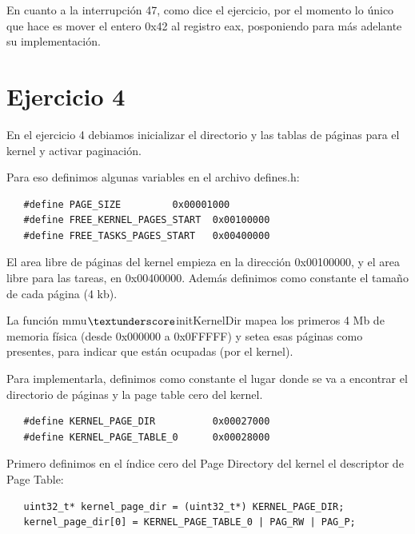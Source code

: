 \documentclass[a4paper]{article}
\newenvironment{codesnippet}{%
	\begin{Sbox}\begin{minipage}{\textwidth}\sffamily\small}%
	{\end{minipage}\end{Sbox}%
		\begin{center}%
		\vspace{-0.4cm}\colorbox{litegrey}{\TheSbox}\end{center}\vspace{0.3cm}}
\begin{document}
En cuanto a la interrupción 47, como dice el ejercicio, por el momento lo único que hace es mover el entero 0x42 al
registro eax, posponiendo para más adelante su implementación.


\section{Ejercicio 4}
En el ejercicio 4 debiamos inicializar el directorio y las tablas de páginas para el kernel y activar paginación.

Para eso definimos algunas variables en el archivo defines.h:

	\begin{codesnippet}
  \begin{verbatim}
   #define PAGE_SIZE  		 0x00001000
   #define FREE_KERNEL_PAGES_START  0x00100000 
   #define FREE_TASKS_PAGES_START   0x00400000
	  \end{verbatim}
\end{codesnippet}
	
El area libre de páginas del kernel empieza en la dirección 0x00100000, y el area libre para las tareas, en 0x00400000.
Además definimos como constante el tamaño de cada página (4 kb).

La función mmu$\textunderscore$initKernelDir mapea los primeros 4 Mb de memoria física (desde 0x000000 a 0x0FFFFF) y
setea esas páginas como presentes, para indicar que están ocupadas (por el kernel).

Para implementarla, definimos como constante el lugar donde se va a encontrar el directorio de páginas y la page table
cero del kernel.

	\begin{codesnippet}
  \begin{verbatim}
   #define KERNEL_PAGE_DIR          0x00027000
   #define KERNEL_PAGE_TABLE_0      0x00028000
	  \end{verbatim}
\end{codesnippet}

Primero definimos en el índice cero del Page Directory del kernel el descriptor de Page Table:

	\begin{codesnippet}
  \begin{verbatim}
   uint32_t* kernel_page_dir = (uint32_t*) KERNEL_PAGE_DIR;
   kernel_page_dir[0] = KERNEL_PAGE_TABLE_0 | PAG_RW | PAG_P;
	  \end{verbatim}
\end{codesnippet}
	
\end{document}
